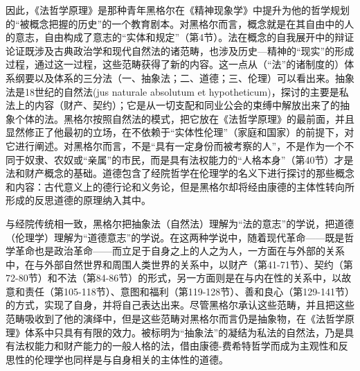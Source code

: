 因此，《法哲学原理》是那种青年黑格尔在《精神现象学》中提升为他的哲学规划的“被概念把握的历史”的一个教育剧本。对黑格尔而言，概念就是在其自由中的人的意志，自由构成了意志的“实体和规定”（第4节）。法在概念的自我展开中的辩证论证既涉及古典政治学和现代自然法的诸范畴，也涉及历史—精神的“现实”的形成过程，通过这一过程，这些范畴获得了新的内容。这一点从（“法”的诸制度的）体系纲要以及体系的三分法（一、抽象法；二、道德；三、伦理）可以看出来。抽象法是18世纪的自然法(jus naturale absolutum et hypotheticum)，探讨的主要是私法上的内容（财产、契约）；它是从一切支配和同业公会的束缚中解放出来了的抽象个体的法。黑格尔按照自然法的模式，把它放在《法哲学原理》的最前面，并且显然修正了他最初的立场，在不依赖于“实体性伦理”（家庭和国家）的前提下，对它进行阐述。对黑格尔而言，不是“具有一定身份而被考察的人”，不是作为一个不同于奴隶、农奴或“亲属”的市民，而是具有法权能力的“人格本身”（第40节）才是法和财产概念的基础。道德包含了经院哲学在伦理学的名义下进行探讨的那些概念和内容：古代意义上的德行论和义务论，但是黑格尔却将经由康德的主体性转向所形成的反思道德的原理纳入其中。

与经院传统相一致，黑格尔把抽象法（自然法）理解为“法的意志”的学说，把道德（伦理学）理解为“道德意志”的学说。在这两种学说中，随着现代革命——既是哲学革命也是政治革命——而立足于自身之上的人之为人，一方面在与外部的关系中，在与外部自然世界和周围人类世界的关系中，以财产（第41-71节）、契约（第72-80节）和不法（第84-86节）的形式，另一方面则是在与内在性的关系中，以故意和责任（第105-118节）、意图和福利（第119-128节）、善和良心（第129-141节）的方式，实现了自身，并将自己表达出来。尽管黑格尔承认这些范畴，并且把这些范畴吸收到了他的演绎中，但是这些范畴对黑格尔而言仍是抽象物，在《法哲学原理》体系中只具有有限的效力。被标明为“抽象法”的凝结为私法的自然法，乃是具有法权能力和财产能力的一般人格的法，借由康德-费希特哲学而成为主观性和反思性的伦理学也同样是与自身相关的主体性的道德。

